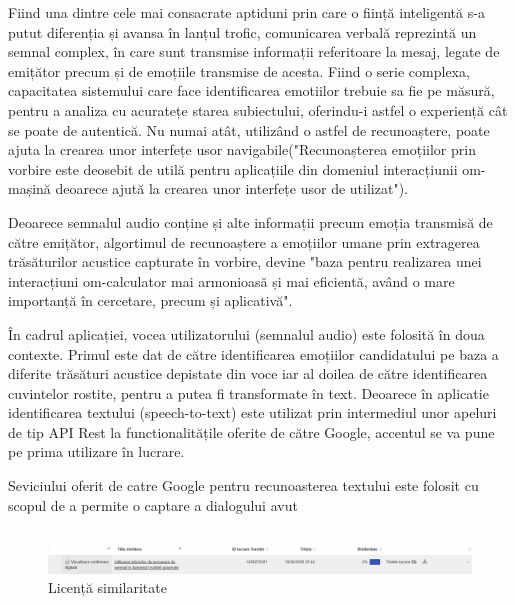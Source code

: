 \documentclass[a4paper, 12pt]{report}
\begin{document}
	Fiind una dintre cele mai consacrate aptiduni prin care o ființă inteligentă s-a putut diferenția și avansa în lanțul trofic, comunicarea verbală reprezintă un semnal complex, în care sunt transmise informații referitoare la mesaj, legate de emițător precum și de emoțiile transmise de acesta. Fiind o serie complexa, capacitatea sistemului care face identificarea emotiilor trebuie sa fie pe măsură, pentru a analiza cu acuratețe starea subiectului, oferindu-i astfel o experiență cât se poate de autentică. Nu numai atât, utilizând o astfel de recunoaștere, poate ajuta la crearea unor interfețe usor navigabile("Recunoașterea emoțiilor prin vorbire este deosebit de utilă pentru aplicațiile din domeniul interacțiunii om-mașină deoarece ajută la crearea unor interfețe usor de utilizat"\cite{emotion_recognition_survery}).
	
	Deoarece semnalul audio conține și alte informații precum emoția transmisă de către emițător, algortimul de recunoaștere a emoțiilor umane prin extragerea trăsăturilor acustice capturate în vorbire, devine "baza pentru realizarea unei interacțiuni om-calculator mai armonioasă și mai eficientă, având o mare importanță în cercetare, precum și aplicativă"\cite{audio_emotion_recognition0}.
	
	În cadrul aplicației, vocea utilizatorului (semnalul audio) este folosită în doua contexte. Primul este dat de către identificarea emoțiilor candidatului pe baza a diferite trăsături acustice depistate din voce iar al doilea de către identificarea cuvintelor rostite, pentru a putea fi transformate în text. Deoarece în aplicatie identificarea textului (speech-to-text) este utilizat prin intermediul unor apeluri de tip API Rest la functionalitățile oferite de către Google, accentul se va pune pe prima utilizare în lucrare.
	
	Seviciului oferit de catre Google pentru recunoasterea textului este folosit cu scopul de a permite o captare a dialogului avut
	
	
	
	\subsection{}
	\clearpage
	
   \printbibliography
   \clearpage
	\begin{figure}[H]
		\begin{center}
			\includegraphics[scale=0.4]{images/plagiat.PNG}
		\end{center}
		\caption{Licență similaritate}
		\label{fig:sim}
	\end{figure} 	
\end{document}
